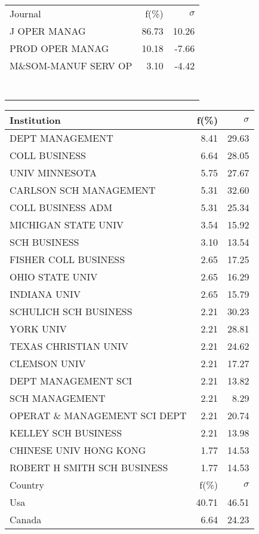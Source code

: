 \documentclass[a4paper,11pt]{report}
\begin{document}
\begin{landscape}
\begin{table}[!ht]
{\begin{tabular}{|l r r|}
 &  & \\
\hline
\hline
Journal & f(\%) & $\sigma$\\
\hline
J OPER MANAG & 86.73 & 10.26\\
PROD OPER MANAG & 10.18 & -7.66\\
M\&SOM-MANUF SERV OP & 3.10 & -4.42\\
 &  & \\
 &  & \\
 &  & \\
 &  & \\
 &  & \\
 &  & \\
 &  & \\
\hline
\end{tabular}
}
{\scriptsize\begin{tabular}{|l r r|}
\hline
Institution & f(\%) & $\sigma$\\
\hline
DEPT MANAGEMENT & 8.41 & 29.63\\
COLL BUSINESS & 6.64 & 28.05\\
UNIV MINNESOTA & 5.75 & 27.67\\
CARLSON SCH MANAGEMENT & 5.31 & 32.60\\
COLL BUSINESS ADM & 5.31 & 25.34\\
MICHIGAN STATE UNIV & 3.54 & 15.92\\
SCH BUSINESS & 3.10 & 13.54\\
FISHER COLL BUSINESS & 2.65 & 17.25\\
OHIO STATE UNIV & 2.65 & 16.29\\
INDIANA UNIV & 2.65 & 15.79\\
SCHULICH SCH BUSINESS & 2.21 & 30.23\\
YORK UNIV & 2.21 & 28.81\\
TEXAS CHRISTIAN UNIV & 2.21 & 24.62\\
CLEMSON UNIV & 2.21 & 17.27\\
DEPT MANAGEMENT SCI & 2.21 & 13.82\\
SCH MANAGEMENT & 2.21 & 8.29\\
OPERAT \& MANAGEMENT SCI DEPT & 2.21 & 20.74\\
KELLEY SCH BUSINESS & 2.21 & 13.98\\
CHINESE UNIV HONG KONG & 1.77 & 14.53\\
ROBERT H SMITH SCH BUSINESS & 1.77 & 14.53\\
\hline
\hline
Country & f(\%) & $\sigma$\\
\hline
Usa & 40.71 & 46.51\\
Canada & 6.64 & 24.23\\

\end{tabular}}
\end{table}
\end{landscape}
\end{document}
